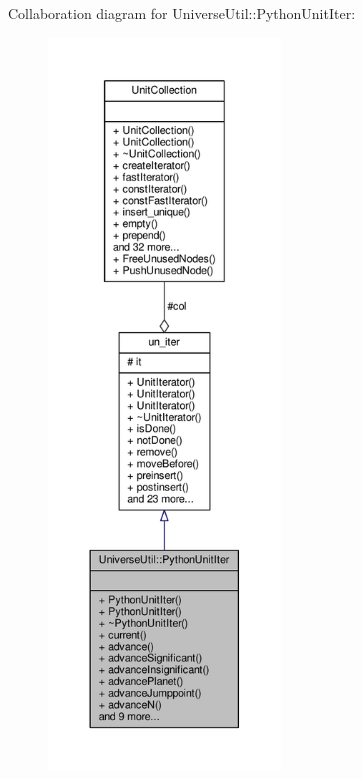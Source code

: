 Collaboration diagram for Universe\+Util\+:\+:Python\+Unit\+Iter\+:
\nopagebreak
\begin{figure}[H]
\begin{center}
\leavevmode
\includegraphics[height=550pt]{d2/d71/classUniverseUtil_1_1PythonUnitIter__coll__graph}
\end{center}
\end{figure}
